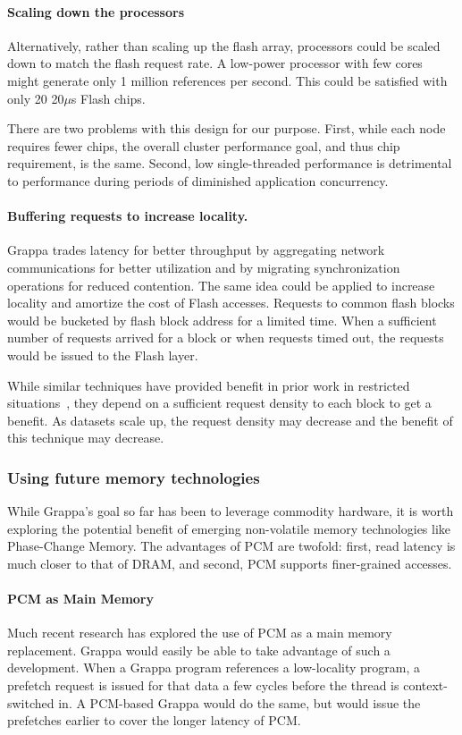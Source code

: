 \paragraph{Scaling down the processors}
Alternatively, rather than scaling up the flash array, processors
could be scaled down to match the flash request rate. A low-power
processor with few cores might generate only 1 million references per
second. This could be satisfied with only 20 20$\mu$s Flash chips.

There are two problems with this design for our purpose. First, while each node
requires fewer chips, the overall cluster performance goal, and thus
chip requirement, is the same. Second, low single-threaded performance is detrimental to performance during periods of diminished application concurrency.

\paragraph{Buffering requests to increase locality.}
Grappa trades latency for better throughput by aggregating network
communications for better utilization and by migrating synchronization
operations for reduced contention. The same idea could be applied to
increase locality and amortize the cost of Flash accesses. Requests
to common flash blocks would be bucketed by flash block address for a
limited time. When a sufficient number of requests arrived for a block
or when requests timed out, the requests would be issued to the Flash
layer.

While similar techniques have provided benefit in prior work in
restricted situations~\cite{magt:2010,graphchi:osdi12}, they depend on a sufficient request
density to each block to get a benefit. As datasets scale up, the
request density may decrease and the benefit of this technique may
decrease.

\subsubsection{Using future memory technologies}

While Grappa's goal so far has been to leverage commodity hardware, it
is worth exploring the potential benefit of emerging non-volatile
memory technologies like Phase-Change Memory. The advantages of PCM
are twofold: first, read latency is much closer to that of DRAM, and
second, PCM supports finer-grained accesses.

\paragraph{PCM as Main Memory}
Much recent research has explored the use of PCM as a main memory
replacement. Grappa would easily be able to take advantage of such a
development. When a Grappa program references a low-locality program,
a prefetch request is issued for that data a few cycles before the
thread is context-switched in. A PCM-based
Grappa would do the same, but would issue the prefetches earlier to
cover the longer latency of PCM.

